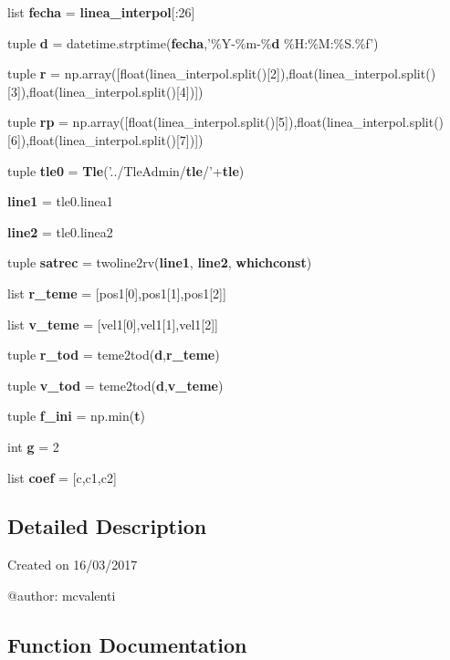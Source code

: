 \begin{DoxyCompactItemize}
\item 
list {\bf fecha} = {\bf linea\-\_\-interpol}[\-:26]
\item 
tuple {\bf d} = datetime.\-strptime({\bf fecha},'\%\-Y-\/\%m-\/\%{\bf d} \%\-H\-:\%\-M\-:\%\-S.\%f')
\item 
tuple {\bf r} = np.\-array([float(linea\-\_\-interpol.\-split()[2]),float(linea\-\_\-interpol.\-split()[3]),float(linea\-\_\-interpol.\-split()[4])])
\item 
tuple {\bf rp} = np.\-array([float(linea\-\_\-interpol.\-split()[5]),float(linea\-\_\-interpol.\-split()[6]),float(linea\-\_\-interpol.\-split()[7])])
\item 
tuple {\bf tle0} = {\bf \-Tle}('../\-Tle\-Admin/{\bf tle}/'+{\bf tle})
\item 
{\bf line1} = tle0.\-linea1
\item 
{\bf line2} = tle0.\-linea2
\item 
tuple {\bf satrec} = twoline2rv({\bf line1}, {\bf line2}, {\bf whichconst})
\item 
list {\bf r\-\_\-teme} = [pos1[0],pos1[1],pos1[2]]
\item 
list {\bf v\-\_\-teme} = [vel1[0],vel1[1],vel1[2]]
\item 
tuple {\bf r\-\_\-tod} = teme2tod({\bf d},{\bf r\-\_\-teme})
\item 
tuple {\bf v\-\_\-tod} = teme2tod({\bf d},{\bf v\-\_\-teme})
\item 
tuple {\bf f\-\_\-ini} = np.\-min({\bf t})
\item 
int {\bf g} = 2
\item 
list {\bf coef} = [c,c1,c2]
\end{DoxyCompactItemize}


\subsection{\-Detailed \-Description}
\begin{DoxyVerb}
Created on 16/03/2017

@author: mcvalenti
\end{DoxyVerb}
 

\subsection{\-Function \-Documentation}
